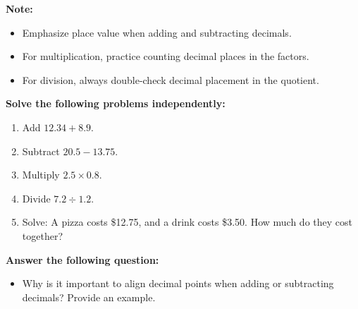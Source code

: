 \documentclass[12pt]{article}
\begin{document}
\vspace{1em}

\begin{tcolorbox}[colframe=black!40, colback=gray!5, 
coltitle=black, colbacktitle=black!20, fonttitle=\bfseries\Large, 
title=Additional Notes, halign title=center, left=5pt, right=5pt, top=5pt, bottom=15pt]
\textbf{Note:}
\begin{itemize}
    \item Emphasize place value when adding and subtracting decimals.
    \item For multiplication, practice counting decimal places in the factors.
    \item For division, always double-check decimal placement in the quotient.
\end{itemize}
\end{tcolorbox}

\vspace{1em}

\begin{tcolorbox}[colframe=black!60, colback=white, 
coltitle=black, colbacktitle=black!15, fonttitle=\bfseries\Large, 
title=Independent Practice, halign title=center, left=10pt, right=10pt, top=10pt, bottom=15pt]
\textbf{Solve the following problems independently:}
\begin{enumerate}[itemsep=5em] 
    \item Add \( 12.34 + 8.9 \). 
    \item Subtract \( 20.5 - 13.75 \). 
    \item Multiply \( 2.5 \times 0.8 \). 
    \item Divide \( 7.2 \div 1.2 \). 
    \item Solve: A pizza costs \$12.75, and a drink costs \$3.50. How much do they cost together?
\end{enumerate}
\end{tcolorbox}

\vspace{1em}

\begin{tcolorbox}[colframe=black!60, colback=white, 
coltitle=black, colbacktitle=black!15, fonttitle=\bfseries\Large, 
title=Exit Ticket, halign title=center, left=10pt, right=10pt, top=10pt, bottom=15pt]
\textbf{Answer the following question:}
\begin{itemize}
    \item Why is it important to align decimal points when adding or subtracting decimals? Provide an example.
\end{itemize}
\end{tcolorbox}
\end{document}

